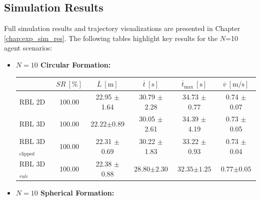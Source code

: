     \subsection{Simulation Results}
        Full simulation results and trajectory visualizations are presented in Chapter \ref{chap:exp_sim_res}. 
        The following tables highlight key results for the $N$=10 agent scenarios:
        \begin{itemize}
            \item \textbf{$N = 10$ Circular Formation:}
                \begin{table}[H]
                    \centering
                    \renewcommand{\arraystretch}{1.2}
                    \begin{tabular}{|l|c|c|c|c|c|}
                    \hline
                                                & \( SR \ [\%] \) & \( \overline{L} \ [\mathrm{m}] \) & \( \overline{t} \ [\mathrm{s}] \) & \( \overline{t}_{\text{max}} \ [\mathrm{s}] \) & \( \overline{v} \ [\mathrm{m/s}] \)     \\ \hline
                    RBL 2D                      & 100.00          & 22.95 $\pm$ 1.64                  & 30.79 $\pm$ 2.28                  & 34.73 $\pm$ 0.77                               & 0.74 $\pm$ 0.07                         \\ \hline
                    RBL 3D                      & 100.00          & $\mathbf{22.22} \boldsymbol{\pm} \mathbf{0.89}$                  & 30.05 $\pm$ 2.61                  & 34.39 $\pm$ 4.19                               & 0.73 $\pm$ 0.05                         \\ \hline
                    RBL 3D\(_{\text{clipped}}\) & 100.00          & 22.31 $\pm$ 0.69                  & 30.22 $\pm$ 1.83                  & 33.22 $\pm$ 0.93                               & 0.73 $\pm$ 0.04                         \\ \hline
                    RBL 3D\(_{rule}\)                & 100.00          & 22.38 $\pm$ 0.88                  & $\mathbf{28.80} \boldsymbol{\pm} \mathbf{2.30}$                  & $\mathbf{32.35} \boldsymbol{\pm} \mathbf{1.25}$                               & $\mathbf{0.77} \boldsymbol{\pm} \mathbf{0.05}$                         \\ \hline
                    \end{tabular}
                \end{table}
            \item \textbf{$N = 10$ Spherical Formation:}
                \begin{table}[H]

\end{table}
\end{itemize}
